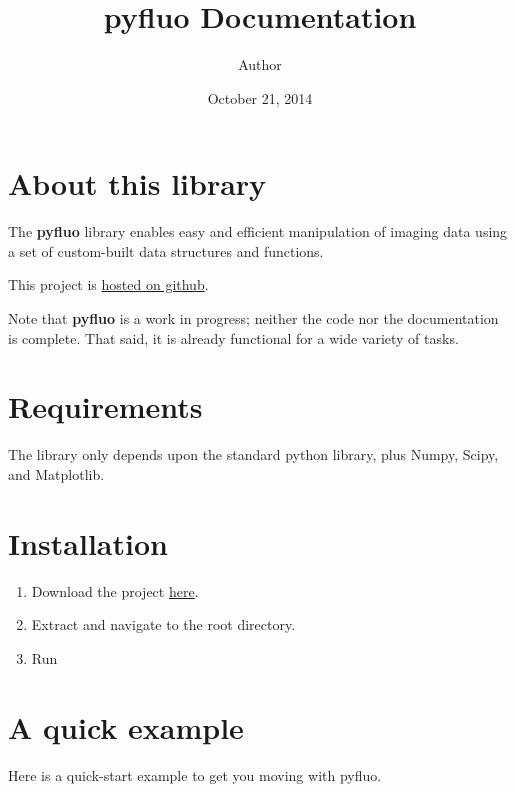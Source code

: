 \documentclass[letterpaper,10pt,english]{sphinxmanual}
\title{pyfluo Documentation}
\date{October 21, 2014}
\author{Author}
\begin{document}
\maketitle
\tableofcontents
{}\label{index::doc}



\chapter{About this library}
\label{introduction:welcome-to-the-documentation-for-pyfluo}\label{introduction:about-this-library}\label{introduction::doc}
The \textbf{pyfluo} library enables easy and efficient manipulation of imaging data using a set of custom-built data structures and functions.

This project is \href{https://github.com/bensondaled/pyfluo/}{hosted on github}.

Note that \textbf{pyfluo} is a work in progress; neither the code nor the documentation is complete. That said, it is already functional for a wide variety of tasks.


\chapter{Requirements}
\label{introduction:requirements}
The library only depends upon the standard python library, plus Numpy, Scipy, and Matplotlib.


\chapter{Installation}
\label{introduction:installation}\begin{enumerate}
\item {} 
Download the project \href{https://github.com/bensondaled/pyfluo/}{here}.

\item {} 
Extract and navigate to the root directory.

\item {} 
Run 

\end{enumerate}


\chapter{A quick example}
\label{introduction:a-quick-example}
Here is a quick-start example to get you moving with pyfluo.
\end{document}
